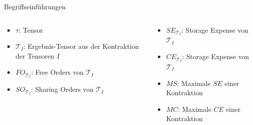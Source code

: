 \documentclass{beamer}
\newcommand{\Tau}{\mathcal{T}}
\begin{document}
\begin{frame}{Begriffseinführungen}
	\begin{columns}
		\begin{column}{0.5\textwidth}
			\begin{itemize}
				\item $\tau$: Tensor
				\item $\Tau_I$: Ergebnis-Tensor aus der Kontraktion der Tensoren $I$
				\item $FO_{\Tau_I}$: Free Orders von $\Tau_I$
				\item $SO_{\Tau_I}$: Sharing Orders von $\Tau_I$
			\end{itemize}
		\end{column}
		\begin{column}{0.5\textwidth}
			\begin{itemize}
				\item $SE_{\Tau_I}$: Storage Expense von $\Tau_I$
				\item $CE_{\Tau_I}$: Storage Expense von $\Tau_I$
				\item $MS$: Maximale $SE$ einer Kontraktion 
				\item $MC$: Maximale $CE$ einer Kontraktion 
			\end{itemize}
		\end{column}
	\end{columns}
\end{frame}
\end{document}
